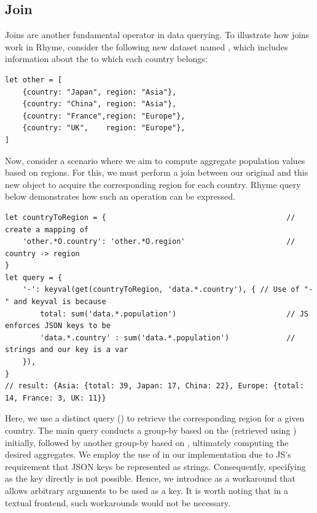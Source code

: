 \documentclass[runningheads]{llncs}
\newcommand{\lang}{Rhyme}
\begin{document}
\vspace{-3mm}
\subsection{Join}
\vspace{-2mm}
Joins are another fundamental operator in data querying.
To illustrate how joins work in \lang{}, consider the following
new dataset named , which includes information about the
 to which each country belongs:

\begin{lstlisting}[style=JavaScript, columns=flexible]
let other = [
    {country: "Japan", region: "Asia"},
    {country: "China", region: "Asia"},
    {country: "France",region: "Europe"},
    {country: "UK",    region: "Europe"},
]
\end{lstlisting}
\vspace{-2mm}

Now, consider a scenario where we aim to compute aggregate population
values based on regions.
For this, we must perform a join between our original
 and this new  object to acquire the
corresponding region for each country.
\lang{} query below demonstrates how such an operation can be
expressed.

\begin{lstlisting}[style=JavaScript, columns=flexible]
let countryToRegion = {                                         // create a mapping of 
    'other.*O.country': 'other.*O.region'                       // country -> region
}
let query = {
    '-': keyval(get(countryToRegion, 'data.*.country'), { // Use of "-" and keyval is because
        total: sum('data.*.population')                         // JS enforces JSON keys to be
        'data.*.country' : sum('data.*.population')             // strings and our key is a var
    }),
}
// result: {Asia: {total: 39, Japan: 17, China: 22}, Europe: {total: 14, France: 3, UK: 11}}
\end{lstlisting}

Here, we use a distinct query () to retrieve the
corresponding region for a given country.
The main query conducts a group-by based on the  (retrieved using ) initially,
followed by another group-by based on , ultimately computing the
desired aggregates.
 We employ the use of  in our implementation due to JS's requirement that JSON
keys be represented as strings.
Consequently, specifying  as the key directly
is not possible.
Hence, we introduce  as a workaround that allows arbitrary
arguments to be used as a key.
It is worth noting that in a textual frontend, such workarounds would not be necessary.
\end{document}

